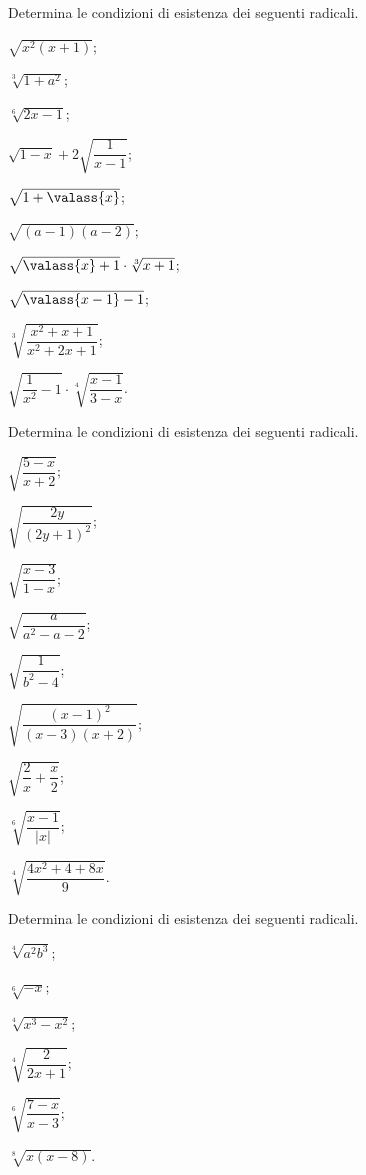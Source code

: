 \begin{esercizio}[\Ast]
 \label{ese:2.12}
Determina le condizioni di esistenza dei seguenti radicali.
 \begin{multicols}{3}
 \begin{enumeratea}
 \item $\sqrt{x^2(x+1)}$;
 \item $\sqrt[3]{1+a^2}$;
 \item $\sqrt[6]{2x-1}$;
 \item $\sqrt{1-x}+2\sqrt{\dfrac 1{x-1}}$;
 \item $\sqrt{1+\valass{x}}$;
 \item $\sqrt{(a-1)(a-2)}$;
 \item $\sqrt{\valass{x}+1}\cdot \sqrt[3]{x+1}$;
 \item $\sqrt{\valass{x-1}-1}$;
 \item $\sqrt[3]{\dfrac{x^2+x+1}{x^2+2x+1}}$;
 \item $\sqrt{\dfrac 1{x^2}-1}\cdot \sqrt[4]{\dfrac{x-1}{3-x}}$.
 \end{enumeratea}
 \end{multicols}
\end{esercizio}

\begin{esercizio}[\Ast]
 \label{ese:2.13}
Determina le condizioni di esistenza dei seguenti radicali.
 \begin{multicols}{3}
 \begin{enumeratea}
 \item $\sqrt{\dfrac{5-x}{x+2}}$;
 \item $\sqrt{\dfrac{2y}{(2y+1)^2}}$;
 \item $\sqrt{\dfrac{x-3}{1-x}}$;
 \item $\sqrt{\dfrac a{a^2-a-2}}$;
 \item $\sqrt{\dfrac 1{b^2-4}}$;
 \item $\sqrt{\dfrac{(x-1)^2}{(x-3)(x+2)}}$;
 \item $\sqrt{\dfrac 2 x+\dfrac x 2}$;
 \item $\sqrt[6]{\dfrac{x-1}{\left|x\right|}}$;
 \item $\sqrt[4]{\dfrac{4x^2+4+8x} 9}$.
 \end{enumeratea}
 \end{multicols}
\end{esercizio}

\begin{esercizio}[\Ast]
Determina le condizioni di esistenza dei seguenti radicali.
 \label{ese:2.14}
 \begin{multicols}{3}
 \begin{enumeratea}
 \item $\sqrt[4]{a^2 b^3}$;
 \item $\sqrt[6]{-x}$;
 \item $\sqrt[4]{x^3 - x^2}$;
 \item $\sqrt[4]{\dfrac{2}{2x+1}}$;
 \item $\sqrt[6]{\dfrac{7-x}{x-3}}$;
 \item $\sqrt[8]{x(x-8)}$.
 \end{enumeratea}
 \end{multicols}
\end{esercizio}

